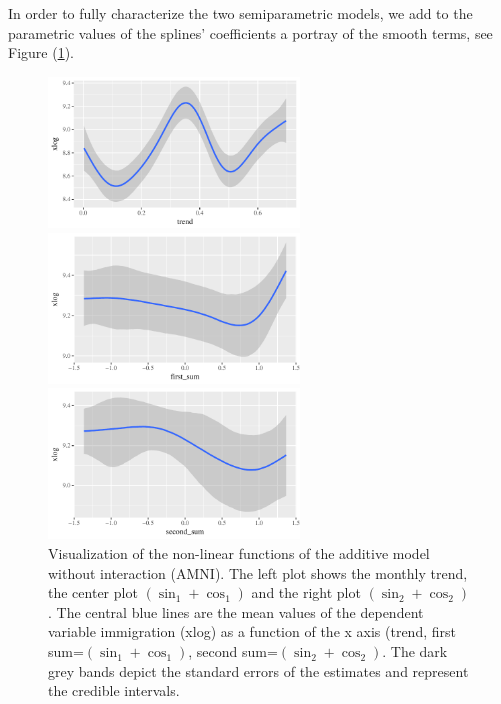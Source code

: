 \documentclass{article}\usepackage[]{graphicx}\usepackage[]{color}
\begin{document}
In order to fully characterize the two semiparametric models, we add to the parametric values of the splines' coefficients a portray of the smooth terms, see Figure (\ref{fig:smooth gam}).
\begin{figure}[bp!]
\begin{minipage}{.33\linewidth}
\centering
\includegraphics[width=\columnwidth, height=4cm]{smooth1_b_gamm_2004.pdf}
\end{minipage}
\begin{minipage}{.33\linewidth}
\centering
\includegraphics[width=\columnwidth, height=4cm]{smooth2_b_gamm_2004.pdf}
\end{minipage}
\begin{minipage}{.33\linewidth}
\centering
\includegraphics[width=\columnwidth, height=4cm]{smooth3_b_gamm_2004.pdf}
\end{minipage}
\vskip 0.5cm
\caption{Visualization of the non-linear functions of the additive model without interaction (AMNI). The left plot shows the monthly trend, the center plot $(\sin_{1} + \cos_{1})$ and the right plot $(\sin_{2} + \cos_{2})$. The central blue lines are the mean values of the dependent variable immigration (xlog) as a function of the x axis (trend, first sum=$(\sin_{1} + \cos_{1})$, second sum=$(\sin_{2} + \cos_{2})$. The dark grey bands depict the standard errors of the estimates and represent the credible intervals.}
\label{fig:smooth gam}
\end{figure}
\end{document}
